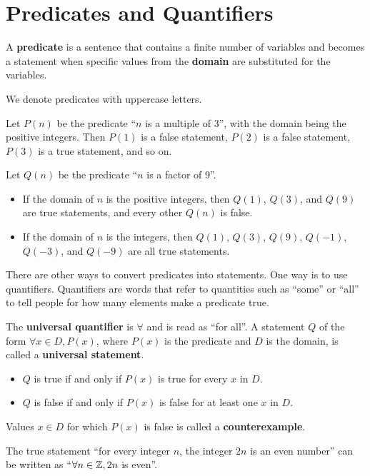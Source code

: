 \section{Predicates and Quantifiers}
\begin{definition}
    A \textbf{predicate} is a sentence that contains a finite number of variables and becomes a statement when specific values from the \textbf{domain} are substituted for the variables.
\end{definition}
\begin{remark}
    We denote predicates with uppercase letters.
\end{remark}
\begin{example}
    Let $P(n)$ be the predicate ``$n$ is a multiple of 3'', with the domain being the positive integers. Then $P(1)$ is a false statement, $P(2)$ is a false statement, $P(3)$ is a true statement, and so on.
\end{example}
\begin{example}
    Let $Q(n)$ be the predicate ``$n$ is a factor of 9''.
    \begin{itemize}
        \item If the domain of $n$ is the positive integers, then $Q(1)$, $Q(3)$, and $Q(9)$ are true statements, and every other $Q(n)$ is false.
        \item If the domain of $n$ is the integers, then $Q(1)$, $Q(3)$, $Q(9)$, $Q(-1)$, $Q(-3)$, and $Q(-9)$ are all true statements.
    \end{itemize}
\end{example}

There are other ways to convert predicates into statements. One way is to use quantifiers. Quantifiers are words that refer to quantities such as ``some'' or ``all'' to tell people for how many elements make a predicate true.
\begin{definition}
    The \textbf{universal quantifier} is $\forall$ and is read as ``for all''. A statement $Q$ of the form $\forall x \in D, P(x)$, where $P(x)$ is the predicate and $D$ is the domain, is called a \textbf{universal statement}.
    \begin{itemize}
        \item $Q$ is true if and only if $P(x)$ is true for every $x$ in $D$.
        \item $Q$ is false if and only if $P(x)$ is false for at least one $x$ in $D$.
    \end{itemize}
    Values $x \in D$ for which $P(x)$ is false is called a \textbf{counterexample}.
\end{definition}
\begin{example}
    The true statement ``for every integer $n$, the integer $2n$ is an even number'' can be written as ``$\forall n \in \mathbb{Z}, 2n$ is even''.
\end{example}

